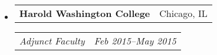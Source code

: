 \documentclass[10pt,letterpaper]{article}
\makeatletter
\newcommand{\headerrow}[2]
{\begin{tabular*}{\linewidth}{l@{\extracolsep{\fill}}r}
	#1 &
	#2 \\
\end{tabular*}}
\makeatother
\begin{document}
\begin{itemize}
	\parskip=-0.1em
	\item
	\headerrow
		{\textbf{Harold Washington College}}
		{Chicago, IL}
	\headerrow
		{\emph{Adjunct Faculty}}
		{\emph{Feb 2015--May 2015}}

%

\end{itemize}
\end{document}
